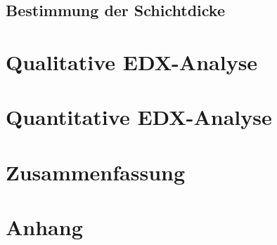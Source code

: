 \documentclass[12pt,english,ngerman]{scrartcl}
\begin{document}
\subsection{Bestimmung der Schichtdicke}


\section{Qualitative EDX-Analyse}


\section{Quantitative EDX-Analyse}


\section{Zusammenfassung}


\section{Anhang}





\newpage

\printbibliography
\end{document}

